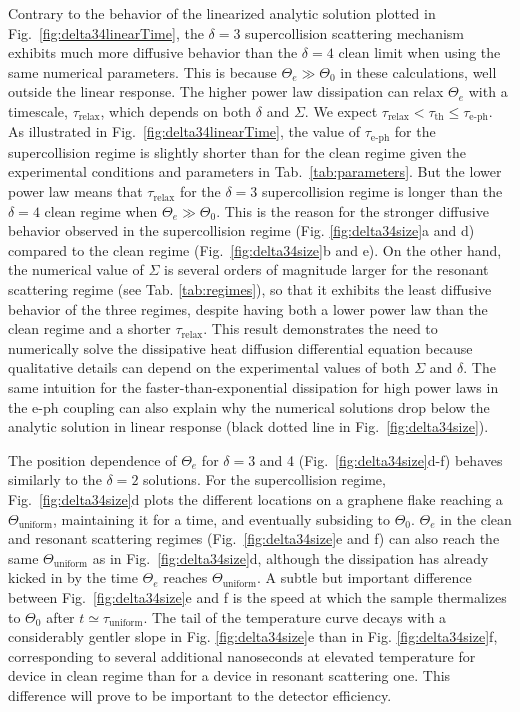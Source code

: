 \documentclass[aip, amsmath,amssymb, reprint]{revtex4-1}
\begin{document}
Contrary to the behavior of the linearized analytic solution plotted in Fig.\ \ref{fig:delta34linearTime}, the $\delta = 3$ supercollision scattering mechanism exhibits much more diffusive behavior than the $\delta = 4$ clean limit when using the same numerical parameters. This is because $\Theta_e\gg\Theta_0$ in these calculations, well outside the linear response. The higher power law dissipation can relax $\Theta_e$ with a timescale, $\tau_{\text{relax}}$, which depends on both $\delta$ and $\Sigma$. We expect 
$\tau_{\text{relax}} < \tau_{\text{th}} \leq \tau_{\text{e-ph}} \label{eqn:tau relax}$. As illustrated in Fig.\ \ref{fig:delta34linearTime}, the value of $\tau_{\text{e-ph}}$ for the supercollision regime is slightly shorter than for the clean regime given the experimental conditions and parameters in Tab.\ \ref{tab:parameters}. But the lower power law means that $\tau_{\text{relax}}$ for the $\delta = 3$ supercollision regime is longer than the $\delta = 4$ clean regime when $\Theta_e\gg\Theta_0$. This is the reason for the stronger diffusive behavior observed in the supercollision regime (Fig. \ref{fig:delta34size}a and d) compared to the clean regime (Fig.\ \ref{fig:delta34size}b and e). On the other hand, the numerical value of $\Sigma$ is several orders of magnitude larger for the resonant scattering regime (see Tab. \ref{tab:regimes}), so that it exhibits the least diffusive behavior of the three regimes, despite having both a lower power law than the clean regime and a shorter $\tau_{\text{relax}}$. This result demonstrates the need to numerically solve the dissipative heat diffusion differential equation because qualitative details can depend on the experimental values of both $\Sigma$ and $\delta$. The same intuition for the faster-than-exponential dissipation for high power laws in the e-ph coupling can also explain why the numerical solutions drop below the analytic solution in linear response (black dotted line in Fig.\ \ref{fig:delta34size}).

The position dependence of $\Theta_e$ for $\delta = 3$ and 4 (Fig.~\ref{fig:delta34size}d-f) behaves similarly to the $\delta = 2$ solutions. For the supercollision regime, Fig.\ \ref{fig:delta34size}d plots the different locations on a graphene flake reaching a $\Theta_{\text{uniform}}$, maintaining it for a time, and eventually subsiding to $\Theta_0$. $\Theta_e$ in the clean and resonant scattering regimes (Fig.\ \ref{fig:delta34size}e and f) can also reach the same $\Theta_{\text{uniform}}$ as in Fig.~\ref{fig:delta34size}d, although the dissipation has already kicked in by the time $\Theta_e$ reaches $\Theta_{\text{uniform}}$. A subtle but important difference between Fig.\ \ref{fig:delta34size}e and f is the speed at which the sample thermalizes to $\Theta_0$ after $t\simeq \tau_{\text{uniform}}$. The tail of the temperature curve decays with a considerably gentler slope in Fig. \ref{fig:delta34size}e than in Fig. \ref{fig:delta34size}f, corresponding to several additional nanoseconds at elevated temperature for device in clean regime than for a device in resonant scattering one. This difference will prove to be important to the detector efficiency.
\end{document}
